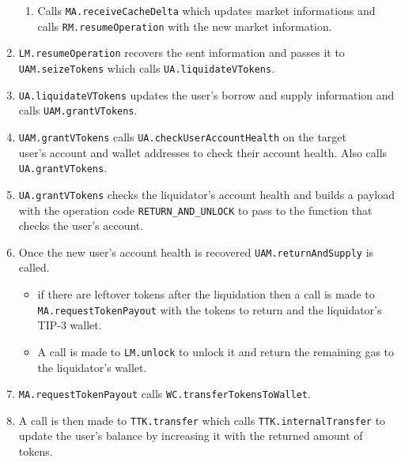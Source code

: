 \begin{enumerate}
\begin{enumerate}
    \item Calls \verb|MA.receiveCacheDelta| which updates market informations and calls \verb|RM.resumeOperation| with the new market information.
  \end{enumerate}
  \item \verb|LM.resumeOperation| recovers the sent information and passes it to \\\verb|UAM.seizeTokens| which calls \verb|UA.liquidateVTokens|.
  \item \verb|UA.liquidateVTokens| updates the user's borrow and supply information and calls \verb|UAM.grantVTokens|.
  \item \verb|UAM.grantVTokens| calls \verb|UA.checkUserAccountHealth| on the target \\user's account and wallet addresses to check their account health. Also calls \verb|UA.grantVTokens|.
  \item \verb|UA.grantVTokens| checks the liquidator's account health and builds a payload with the operation code \verb|RETURN_AND_UNLOCK| to pass to the function that checks the user's account.
  \item Once the new user's account health is recovered \verb|UAM.returnAndSupply| is called.
  \begin{itemize}
    \item if there are leftover tokens after the liquidation then a call is made to \verb|MA.requestTokenPayout| with the tokens to return and the liquidator's TIP-3 wallet.
    \item A call is made to \verb|LM.unlock| to unlock it and return the remaining gas to the liquidator's wallet.
  \end{itemize}
  \item \verb|MA.requestTokenPayout| calls \verb|WC.transferTokensToWallet|.
  \item A call is then made to \verb|TTK.transfer| which calls \verb|TTK.internalTransfer| to update the user's balance by increasing it with the returned amount of tokens.
\end{enumerate}

